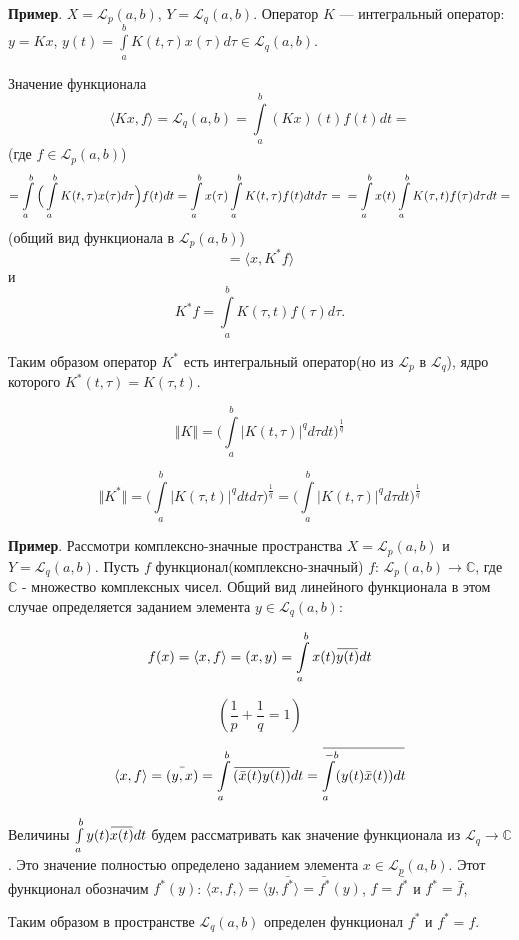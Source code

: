 \documentclass[12pt,a4paper,titlepage,oneside]{book}
\newcommand{\overbar}[1]{\mkern 1.5mu\overline{\mkern-1.5mu#1\mkern-1.5mu}\mkern 1.5mu}
\theoremstyle{definition}
\theoremstyle{plain}
\theoremstyle{remark}
\theoremstyle{remark}
\theoremstyle{remark}
\theoremstyle{remark}
\theoremstyle{plain}
\theoremstyle{plain}
\begin{document}
\textbf{Пример}.
$X=\mathcal{L}_p(a,b)$, $Y=\mathcal{L}_q(a,b)$. Оператор $K$ --- интегральный оператор: $y=Kx$, $y(t)=\int\limits_a^b K(t,\tau)x(\tau)d\tau \in \mathcal{L}_q(a,b)$.

Значение функционала
$$\langle Kx,f \rangle = \mathcal{L}_q(a,b)=\int\limits_a^b (Kx)(t)f(t)dt=$$ 
(где $f \in \mathcal{L}_p(a,b)$)
$$= \int\limits_a^b \Big( \int\limits_a^b K(t,\tau)x(\tau)d\tau \Big) f(t)dt = \int\limits_a^b x(\tau) \int\limits_a^b K(t,\tau)f(t)dt d\tau =\\= \int\limits_a^b x(t) \int\limits_a^b K(\tau,t)f(\tau)d\tau dt =$$
(общий вид функционала в $\mathcal{L}_p(a,b)$)
$$= \langle x,K^{*}f \rangle$$
и
$$K^{*}f=\int\limits_a^b K(\tau, t)f(\tau)d\tau.$$

Таким образом оператор $K^{*}$ есть интегральный оператор(но из $\mathcal{L}_p$ в $\mathcal{L}_q$), ядро которого $K^{*}(t,\tau)=K(\tau,t)$.

$$\Vert K \Vert = \Big( \displaystyle\int\limits_a^b \lvert K(t,\tau) \rvert^q d\tau dt  \Big)^{\frac{1}{q}}$$

$$\Vert K^{*} \Vert =  \Big( \displaystyle\int\limits_a^b \lvert K(\tau, t) \rvert^q dt d\tau  \Big)^{\frac{1}{q}} =  \Big( \displaystyle\int\limits_a^b \lvert K(t,\tau) \rvert^q d\tau dt  \Big)^{\frac{1}{q}}$$


\textbf{Пример}.
Рассмотри комплексно-значные пространства $X=\mathcal{L}_p(a,b)$ и $Y=\mathcal{L}_q(a,b)$. Пусть $f$ функционал(комплексно-значный) $f$: $\mathcal{L}_p(a,b) \to \mathbb{C}$, где $\mathbb{C}$ - множество комплексных чисел. Общий вид линейного функционала в этом случае определяется заданием элемента $y \in \mathcal{L}_q(a,b)$:

$$ f(x) = \langle x, f \rangle = (x,y) = \displaystyle\int\limits_a^b x(t)\overbar{y(t)}dt $$

$$ (\frac{1}{p} + \frac{1}{q} = 1) $$

$$ \langle x, f \rangle  = \bar{(y,x)}  = \displaystyle\int\limits_a^b \overbar{(\bar{x}(t)y(t))} dt = \overbar{\displaystyle\int\limits_a^{-b} (y(t)\bar{x}(t))dt} $$

Величины $\int\limits_a^b y(t)\overbar{x(t)} dt$ будем рассматривать как значение функционала из $\mathcal{L}_q \to \mathbb{C}$. Это значение полностью определено заданием элемента $x \in \mathcal{L}_p(a,b)$. Этот функционал обозначим $f^{*}(y)$:
$\langle x,f, \rangle = \langle y,\bar{f^{*}} \rangle = \bar{f^{*}}(y)$, $f=\bar{f^{*}}$ и $f^{*}=\bar{f}$,

Таким образом в пространстве $\mathcal{L}_q(a,b)$ определен функционал $f^{*}$ и $f^{*}=f$.
\end{document}
